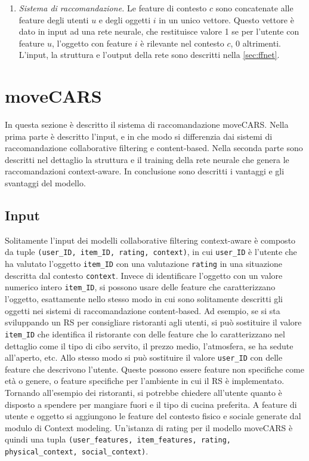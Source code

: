 \documentclass[12pt,italian]{report}
\begin{document}
\begin{enumerate}
 \item \textit{Sistema di raccomandazione.} Le feature di contesto $c$ sono concatenate alle feature degli utenti $u$ e degli oggetti $i$ in un unico vettore. Questo vettore è dato in input ad una rete neurale, che restituisce valore 1 se per l'utente con feature $u$, l'oggetto con feature $i$ è rilevante nel contesto $c$, 0 altrimenti. L'input, la struttura e l'output della rete sono descritti nella \autoref{sec:ffnet}.
\end{enumerate}

\section{moveCARS} \label{sec:ffnet}
In questa sezione è descritto il sistema di raccomandazione moveCARS. Nella prima parte è descritto l'input, e in che modo si differenzia dai sistemi di raccomandazione collaborative filtering e content-based. Nella seconda parte sono descritti nel dettaglio la struttura e il training della rete neurale che genera le raccomandazioni context-aware. In conclusione sono descritti i vantaggi e gli svantaggi del modello.

\subsection{Input} \label{subsec:input}
Solitamente l'input dei modelli collaborative filtering context-aware è composto da tuple \texttt{(user\_ID, item\_ID, rating, context)}, in cui \texttt{user\_ID} è l'utente che ha valutato l'oggetto \texttt{item\_ID} con una valutazione \texttt{rating} in una situazione descritta dal contesto \texttt{context}. Invece di identificare l'oggetto con un valore numerico intero \texttt{item\_ID}, si possono usare delle feature che caratterizzano l'oggetto, esattamente nello stesso modo in cui sono solitamente descritti gli oggetti nei sistemi di raccomandazione content-based. Ad esempio, se si sta sviluppando un RS per consigliare ristoranti agli utenti, si può sostituire il valore \texttt{item\_ID} che identifica il ristorante con delle feature che lo caratterizzano nel dettaglio come il tipo di cibo servito, il prezzo medio, l'atmosfera, se ha sedute all'aperto, etc. Allo stesso modo si può sostituire il valore \texttt{user\_ID} con delle feature che descrivono l'utente. Queste possono essere feature non specifiche come età o genere, o feature specifiche per l'ambiente in cui il RS è implementato. Tornando all'esempio dei ristoranti, si potrebbe chiedere all'utente quanto è disposto a spendere per mangiare fuori e il tipo di cucina preferita. A feature di utente e oggetto si aggiungono le feature del contesto fisico e sociale generate dal modulo di Context modeling. Un'istanza di rating per il modello moveCARS è quindi una tupla \texttt{(user\_features, item\_features, rating, physical\_context, social\_context)}.
\end{document}
